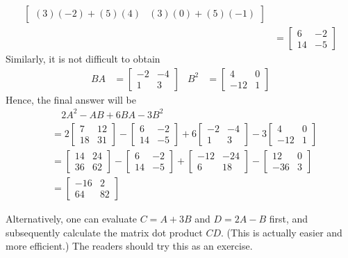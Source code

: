 \begin{solution}
\begin{align*}
\begin{bmatrix}
(3)(-2)+(5)(4) & (3)(0)+(5)(-1) 
\end{bmatrix} \\
&= 
\begin{bmatrix}
6 & -2 \\
14 & -5 
\end{bmatrix}
\end{align*}
Similarly, it is not difficult to obtain
\begin{align*}
BA &= 
\begin{bmatrix}
-2 & -4 \\
1 & 3 
\end{bmatrix} &
B^2 &= 
\begin{bmatrix}
4 & 0 \\
-12 & 1 
\end{bmatrix} 
\end{align*}
Hence, the final answer will be
\begin{align*}
&\quad 2A^2 - AB + 6BA - 3B^2 \\
&= 
2\begin{bmatrix}
7 & 12 \\
18 & 31 
\end{bmatrix}
-\begin{bmatrix}
6 & -2 \\
14 & -5 
\end{bmatrix}
+6\begin{bmatrix}
-2 & -4 \\
1 & 3 
\end{bmatrix}
-3\begin{bmatrix}
4 & 0 \\
-12 & 1 
\end{bmatrix} \\
&=
\begin{bmatrix}
14 & 24 \\
36 & 62 
\end{bmatrix}
-\begin{bmatrix}
6 & -2 \\
14 & -5 
\end{bmatrix}
+\begin{bmatrix}
-12 & -24 \\
6 & 18 
\end{bmatrix}
-\begin{bmatrix}
12 & 0 \\
-36 & 3 
\end{bmatrix} \\
&= 
\begin{bmatrix}
-16 & 2 \\
64 & 82 
\end{bmatrix}
\end{align*}
\end{solution}
Alternatively, one can evaluate $C = A+3B$ and $D = 2A-B$ first, and subsequently calculate the matrix dot product $CD$. (This is actually easier and more efficient.) The readers should try this as an exercise.

